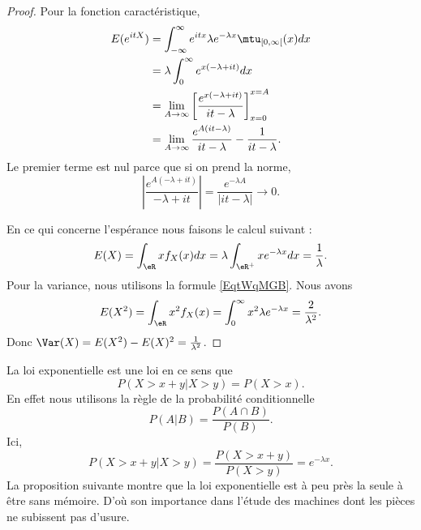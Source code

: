\begin{proof}
	Pour la fonction caractéristique,
	\begin{subequations}
		\begin{align}
			E( e^{itX}) & =\int_{-\infty}^{\infty} e^{it x}\lambda e^{-\lambda x}\mtu_{\mathopen[ 0 , \infty [}(x)dx \\
			            & =\lambda\int_0^{\infty} e^{x(-\lambda+it)}dx                                               \\
			            & =\lim_{A\to\infty}\left[  \frac{  e^{x(-\lambda+it)} }{ it-\lambda } \right]_{x=0}^{x=A}   \\
			            & =\lim_{A\to \infty}\frac{  e^{A(it-\lambda)} }{ it-\lambda }-\frac{1}{ it-\lambda }.
		\end{align}
	\end{subequations}
	Le premier terme est nul parce que si on prend la norme,
	\begin{equation}
		\left| \frac{  e^{A(-\lambda+it)} }{ -\lambda+it } \right| =\frac{  e^{-\lambda A} }{ | it-\lambda | }\to 0.
	\end{equation}

	En ce qui concerne l'espérance nous faisons le calcul suivant :
	\begin{equation}
		E(X)=\int_{\eR}xf_X(x)dx=\lambda\int_{\eR^+}x e^{-\lambda x}dx=\frac{1}{ \lambda }.
	\end{equation}
	Pour la variance, nous utilisons la formule \eqref{EqtWqMGB}. Nous avons
	\begin{equation}
		E(X^2)=\int_{\eR}x^2f_X(x)=\int_0^{\infty}x^2\lambda e^{-\lambda x}=\frac{ 2 }{ \lambda^2 }.
	\end{equation}
	Donc \( \Var(X)=E(X^2)-E(X)^2=\frac{1}{ \lambda^2 }\).
\end{proof}

La loi exponentielle est une loi  en ce sens que
\begin{equation}
	P(X>x+y|X>y)=P(X>x).
\end{equation}
En effet nous utilisons la règle de la probabilité conditionnelle
\begin{equation}
	P(A|B)=\frac{ P(A\cap B) }{ P(B) }.
\end{equation}
Ici,
\begin{equation}
	P(X>x+y|X>y)=\frac{ P(X>x+y) }{ P(X>y) }= e^{-\lambda x}.
\end{equation}
La proposition suivante montre que la loi exponentielle est à peu près la seule à être sans mémoire. D'où son importance dans l'étude des machines dont les pièces ne subissent pas d'usure.


